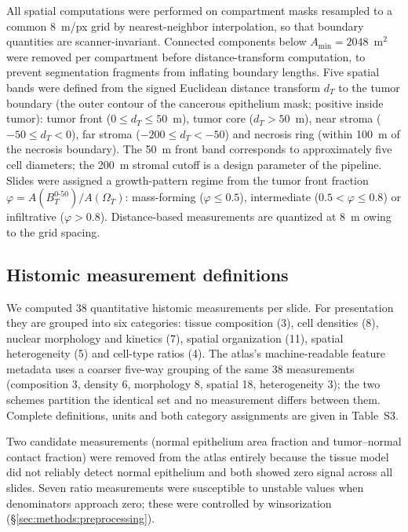 All spatial computations were performed on compartment masks resampled to a
common 8~\textmu m/px grid by nearest-neighbor interpolation, so that boundary
quantities are scanner-invariant. Connected components below
$A_{\min} = \num{2048}$~\textmu m$^2$ were removed per compartment before
distance-transform computation, to prevent segmentation fragments from inflating
boundary lengths. Five spatial bands were defined from the signed Euclidean
distance transform $d_T$ to the tumor boundary (the outer contour of the
cancerous epithelium mask; positive inside tumor): tumor front
($0 \leq d_T \leq 50$~\textmu m), tumor core ($d_T > 50$~\textmu m), near stroma
($-50 \leq d_T < 0$), far stroma ($-200 \leq d_T < -50$) and necrosis ring
(within 100~\textmu m of the necrosis boundary). The 50~\textmu m front band
corresponds to approximately five cell diameters; the 200~\textmu m stromal
cutoff is a design parameter of the pipeline. Slides were assigned a growth-pattern
regime from the tumor front fraction
$\varphi = A(B_T^{0\text{-}50}) / A(\Omega_T)$: mass-forming
($\varphi \leq 0.5$), intermediate ($0.5 < \varphi \leq 0.8$) or infiltrative
($\varphi > 0.8$). Distance-based measurements are quantized at 8~\textmu m
owing to the grid spacing.

\subsection{Histomic measurement definitions}
\label{sec:methods:features}

We computed 38 quantitative histomic measurements per slide. For presentation
they are grouped into six categories: tissue composition (3), cell densities (8),
nuclear morphology and kinetics (7), spatial organization (11), spatial
heterogeneity (5) and cell-type ratios (4). The atlas's machine-readable feature
metadata uses a coarser five-way grouping of the same 38 measurements
(composition 3, density 6, morphology 8, spatial 18, heterogeneity 3); the two
schemes partition the identical set and no measurement differs between them.
Complete definitions, units and both category assignments are given in
Table~S3.

Two candidate measurements (normal epithelium area fraction and tumor--normal
contact fraction) were removed from the atlas entirely because the tissue model
did not reliably detect normal epithelium and both showed zero signal across all
slides. Seven ratio measurements were susceptible to unstable values when
denominators approach zero; these were controlled by winsorization
(\S\ref{sec:methods:preprocessing}).

